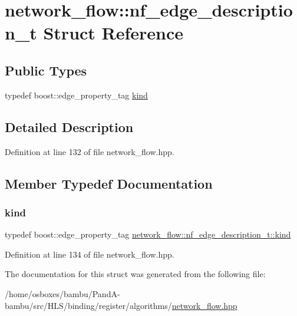 \hypertarget{structnetwork__flow_1_1nf__edge__description__t}{}\section{network\+\_\+flow\+:\+:nf\+\_\+edge\+\_\+description\+\_\+t Struct Reference}
\label{structnetwork__flow_1_1nf__edge__description__t}
\subsection*{Public Types}
\begin{DoxyCompactItemize}
\item 
typedef boost\+::edge\+\_\+property\+\_\+tag \hyperlink{structnetwork__flow_1_1nf__edge__description__t_af2db3f0fe3b47847b35b4d3260a7fa2e}{kind}
\end{DoxyCompactItemize}


\subsection{Detailed Description}


Definition at line 132 of file network\+\_\+flow.\+hpp.



\subsection{Member Typedef Documentation}
\mbox{\label{structnetwork__flow_1_1nf__edge__description__t_af2db3f0fe3b47847b35b4d3260a7fa2e}} 
\subsubsection{\texorpdfstring{kind}{kind}}
{\footnotesize\ttfamily typedef boost\+::edge\+\_\+property\+\_\+tag \hyperlink{structnetwork__flow_1_1nf__edge__description__t_af2db3f0fe3b47847b35b4d3260a7fa2e}{network\+\_\+flow\+::nf\+\_\+edge\+\_\+description\+\_\+t\+::kind}}



Definition at line 134 of file network\+\_\+flow.\+hpp.



The documentation for this struct was generated from the following file\+:\begin{DoxyCompactItemize}
\item 
/home/osboxes/bambu/\+Pand\+A-\/bambu/src/\+H\+L\+S/binding/register/algorithms/\hyperlink{network__flow_8hpp}{network\+\_\+flow.\+hpp}\end{DoxyCompactItemize}
